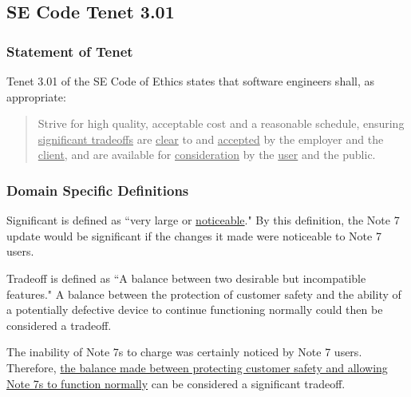 \documentclass[12pt]{article}
\newcounter{subsubsubsection}[subsubsection]
\begin{document}
\subsection{SE Code Tenet 3.01}

   \subsubsection{Statement of Tenet}
      Tenet 3.01 of the SE Code of Ethics states that software engineers shall, as appropriate:
      
      \begin{quote}
         Strive for high quality, acceptable cost and a reasonable schedule, ensuring \uline{significant tradeoffs} are \uline{clear} to and \uline{accepted} by the employer and the \uline{client}, and are available for \uline{consideration} by the \uline{user} and the public.\cite{codeOfEthics}
      \end{quote}
   
   \subsubsection{Domain Specific Definitions}
      
      Significant is defined as ``very large or \uline{noticeable}."\cite{macmillanDefineSignificant} By this definition, the Note 7 update would be significant if the changes it made were noticeable to Note 7 users. 
      
      Tradeoff is defined as ``A balance between two desirable but incompatible features."\cite{oxfordDefineTradeoff} A balance between the protection of customer safety and the ability of a potentially defective device to continue functioning normally could then be considered a tradeoff.
      
      The inability of Note 7s to charge was certainly noticed by Note 7 users. Therefore, \uline{the balance made between protecting customer safety and allowing Note 7s to function normally} can be considered a significant tradeoff.
      
\end{document}
